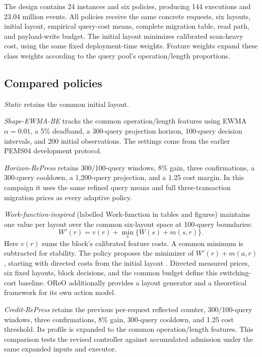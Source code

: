 The design contains 24 instances and six policies, producing 144 executions and 23.04 million events. All policies receive the same concrete requests, six layouts, initial layout, empirical query-cost means, complete migration table, read path, and payload-write budget. The initial layout minimizes calibrated scan-heavy cost, using the same fixed deployment-time weights. Feature weights expand these class weights according to the query pool's operation/length proportions.

\subsection{Compared policies}
\textit{Static} retains the common initial layout.

\textit{Shape-EWMA-BE} tracks the common operation/length features using EWMA $\alpha=0.01$, a 5\% deadband, a 300-query projection horizon, 100-query decision intervals, and 200 initial observations. The settings come from the earlier PEMS04 development protocol.

\textit{Horizon-RePress} retains 300/100-query windows, 8\% gain, three confirmations, a 300-query cooldown, a 1,200-query projection, and a 1.25 cost margin. In this campaign it uses the same refined query means and full three-transaction migration prices as every adaptive policy.

\textit{Work-function-inspired} (labelled Work-function in tables and figures) maintains one value per layout over the common six-layout space at 100-query boundaries:
\begin{equation}
W'(r)=v(r)+\min_s\{W(s)+m(s,r)\}.
\end{equation}
Here $v(r)$ sums the block's calibrated feature costs. A common minimum is subtracted for stability. The policy proposes the minimizer of $W'(r)+m(a,r)$, starting with directed costs from the initial layout \citep{azar2007workfunction}. Directed measured prices, six fixed layouts, block decisions, and the common budget define this switching-cost baseline. OReO additionally provides a layout generator and a theoretical framework for its own action model.

\textit{Credit-RePress} retains the previous per-request reflected counter, 300/100-query windows, three confirmations, 8\% gain, 300-query cooldown, and 1.25 cost threshold. Its profile is expanded to the common operation/length features. This comparison tests the revised controller against accumulated admission under the same expanded inputs and executor.

